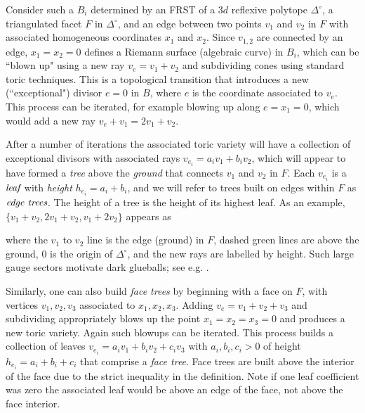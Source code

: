 \documentclass[aps,prl,twocolumn, superscriptaddress,groupedaddress,nofootinbib]{revtex4-1}
\begin{document}
Consider such a $B_i$ determined by an FRST of a $3d$ reflexive polytope
$\Delta^\circ$, a triangulated facet $F$ in $\Delta^\circ$, and an edge
between two points $v_1$ and $v_2$ in $F$ with
associated homogeneous coordinates $x_1$ and $x_2$. Since $v_{1,2}$ are connected
by an edge, $x_1=x_2=0$ defines a Riemann surface (algebraic curve)
in $B_i$, which can be ``blown up" using a new ray $v_e=v_1+v_2$ and subdividing
cones using standard toric techniques. This is a topological transition that introduces
a new (``exceptional") divisor $e=0$ in $B$, where $e$ is the coordinate associated to $v_e$.
This
process can be iterated, for example blowing up along $e=x_1=0$, which would
add a new ray $v_e+v_1=2v_1+v_2$.

After a number of iterations the associated toric variety will have a
collection of exceptional divisors with associated rays $v_{e_i}=a_i v_1 + b_i
v_2$, which will appear to have formed a \emph{tree} above the \emph{ground}
that connects $v_1$ and $v_2$ in $F$. Each $v_{e_i}$ is a $\emph{leaf}$ with
\emph{height} $h_{e_i}=a_i+b_i$, and  we will refer to trees built on edges
within $F$ as $\emph{edge trees}$. The height of a tree is the height of its
highest leaf. As an example, $\{v_1+v_2,2v_1+v_2,v_1+2v_2\}$ appears as
\begin{center} 
\end{center} where the $v_1$ to $v_2$ line is the
edge (ground) in $F$, dashed green lines are above the ground, $0$ is the origin of $\Delta^\circ$, and the new rays
are labelled by height. Such large gauge sectors
motivate dark glueballs; see e.g. \cite{Halverson:2016nfq,*Soni:2016yes,*daRocha:2017cxu,*Acharya:2017szw,*Soni:2017nlm}.

Similarly, one can also build \emph{face trees} by beginning with a face on
$F$, with vertices $v_1, v_2, v_3$ associated to $x_1, x_2, x_3$. Adding $v_e=v_1+v_2+v_3$ and subdividing
appropriately blows up the point $x_1=x_2=x_3=0$  and produces a new toric
variety. Again such blowups can be iterated. This process builds a collection
of leaves $v_{e_i}=a_i v_1 + b_i v_2 + c_i v_3$ with $a_i,b_i,c_i > 0$ of
height $h_{e_i}=a_i+b_i+c_i$ that comprise a \emph{face tree}. Face trees are
built above the interior of the face due to the strict inequality in the
definition. Note if one leaf coefficient was zero the associated leaf would be
above an edge of the face, not above the face interior.
\end{document}
